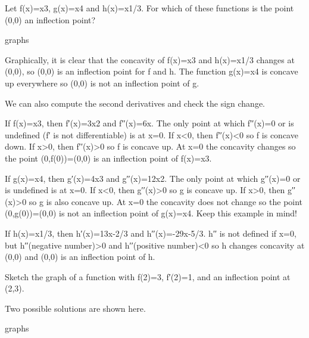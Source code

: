 \begin{example}
Let f(x)=x3, g(x)=x4 and h(x)=x1/3. For which of these functions is the point (0,0) an inflection point?

graphs
\begin{solution} Graphically, it is clear that the concavity of f(x)=x3 and h(x)=x1/3 changes at (0,0), so (0,0) is an inflection point for f and h. The function g(x)=x4 is concave up everywhere so (0,0) is not an inflection point of g.

We can also compute the second derivatives and check the sign change.

If f(x)=x3, then f′(x)=3x2 and f′′(x)=6x. The only point at which f′′(x)=0 or is undefined (f′ is not differentiable) is at x=0. If x<0, then f′′(x)<0 so f is concave down. If x>0, then f′′(x)>0 so f is concave up. At x=0 the concavity changes so the point (0,f(0))=(0,0) is an inflection point of f(x)=x3.

If g(x)=x4, then g′(x)=4x3 and g′′(x)=12x2. The only point at which g′′(x)=0 or is undefined is at x=0. If x<0, then g′′(x)>0 so g is concave up. If x>0, then g′′(x)>0 so g is also concave up. At x=0 the concavity does not change so the point (0,g(0))=(0,0) is not an inflection point of g(x)=x4. Keep this example in mind!

If h(x)=x1/3, then h′(x)=13x-2/3 and h′′(x)=-29x-5/3. h′′ is not defined if x=0, but h′′(negative number)>0 and h′′(positive number)<0 so h changes concavity at (0,0) and (0,0) is an inflection point of h.
\end{solution}\end{example}

\begin{example}
Sketch the graph of a function with f(2)=3, f′(2)=1, and an inflection point at (2,3).

\begin{solution} Two possible solutions are shown here.

graphs
\end{solution}\end{example}
